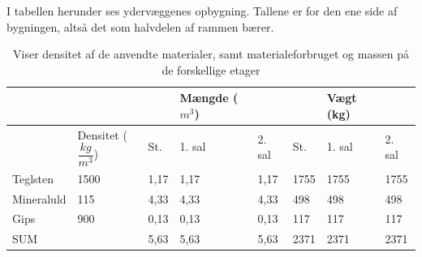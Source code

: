 I tabellen herunder ses ydervæggenes opbygning. Tallene er for den ene side af bygningen, altså det som halvdelen af rammen bærer.
\begin{table}[H]
	\centering
	\begin{tabular}{lll|l|ll|l|l}
		\cline{4-4} \cline{7-7}
		&                                                        &      & Mængde ($m^{3}$) &                             &      & Vægt (kg) &                             \\ \hline
		\multicolumn{1}{|l|}{}           & \multicolumn{1}{l|}{Densitet ($\dfrac{kg}{m^{3}}$)} & St.  & 1. sal                       & \multicolumn{1}{l|}{2. sal} & St.  & 1. sal    & \multicolumn{1}{l|}{2. sal} \\ \hline
		\multicolumn{1}{|l|}{Teglsten}   & \multicolumn{1}{l|}{1500}                              & 1,17 & 1,17                         & \multicolumn{1}{l|}{1,17}   & 1755 & 1755      & \multicolumn{1}{l|}{1755}   \\ \hline
		\multicolumn{1}{|l|}{Mineraluld} & \multicolumn{1}{l|}{115}                               & 4,33 & 4,33                         & \multicolumn{1}{l|}{4,33}   & 498  & 498       & \multicolumn{1}{l|}{498}    \\ \hline
		\multicolumn{1}{|l|}{Gips}       & \multicolumn{1}{l|}{900}                               & 0,13 & 0,13                         & \multicolumn{1}{l|}{0,13}   & 117  & 117       & \multicolumn{1}{l|}{117}    \\ \hline
		\multicolumn{1}{|l|}{SUM}        & \multicolumn{1}{l|}{}                                  & 5,63 & 5,63                         & \multicolumn{1}{l|}{5,63}   & 2371 & 2371      & \multicolumn{1}{l|}{2371}   \\ \hline
	\end{tabular}
	\caption{Viser densitet af de anvendte materialer, samt materialeforbruget og massen på de forskellige etager}
	\label{tabel:EL1}
\end{table}

